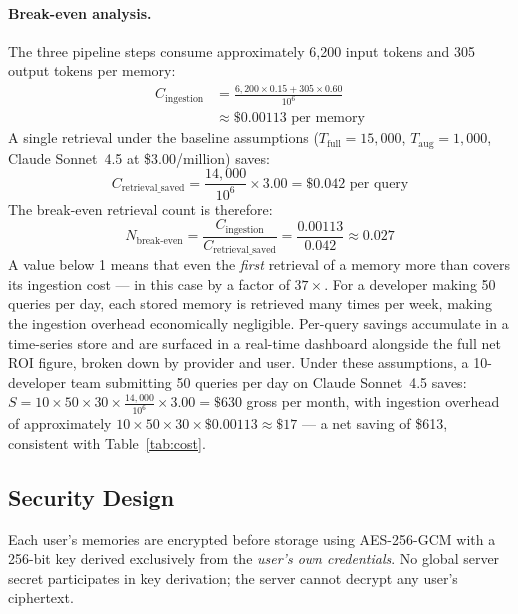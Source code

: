 \documentclass[10pt,twocolumn]{article}
\begin{document}
\paragraph{Break-even analysis.}
The three pipeline steps consume approximately 6{,}200 input tokens and
305 output tokens per memory:
\begin{align}
  C_{\text{ingestion}} &= \frac{6{,}200 \times 0.15 + 305 \times 0.60}{10^6}
      \nonumber \\
      &\approx \$0.00113 \text{ per memory}
  \label{eq:ingestion_cost_example}
\end{align}
A single retrieval under the baseline assumptions
($T_{\text{full}} = 15{,}000$, $T_{\text{aug}} = 1{,}000$, Claude
Sonnet~4.5 at \$3.00/million) saves:
\begin{equation}
  C_{\text{retrieval\_saved}} = \frac{14{,}000}{10^6} \times 3.00
      = \$0.042 \text{ per query}
  \label{eq:retrieval_savings_example}
\end{equation}
The break-even retrieval count is therefore:
\begin{equation}
  N_{\text{break-even}} = \frac{C_{\text{ingestion}}}{C_{\text{retrieval\_saved}}}
      = \frac{0.00113}{0.042} \approx 0.027
  \label{eq:breakeven}
\end{equation}
A value below 1 means that even the \emph{first} retrieval of a memory more
than covers its ingestion cost --- in this case by a factor of $37\times$.
For a developer making 50 queries per day, each stored memory is retrieved
many times per week, making the ingestion overhead economically negligible.
Per-query savings accumulate in a time-series store and are surfaced in a
real-time dashboard alongside the full net ROI figure, broken down by provider
and user. Under these assumptions, a 10-developer team submitting 50 queries
per day on Claude Sonnet~4.5 saves:
$S = 10 \times 50 \times 30 \times \frac{14{,}000}{10^6} \times 3.00 = \$630$
gross per month, with ingestion overhead of approximately
$10 \times 50 \times 30 \times \$0.00113 \approx \$17$ --- a net saving of
\$613, consistent with Table~\ref{tab:cost}.

\subsection{Security Design}

\noindent
Each user's memories are encrypted before storage using AES-256-GCM with a
256-bit key derived exclusively from the \emph{user's own credentials}.
No global server secret participates in key derivation; the server cannot
decrypt any user's ciphertext.
\end{document}
